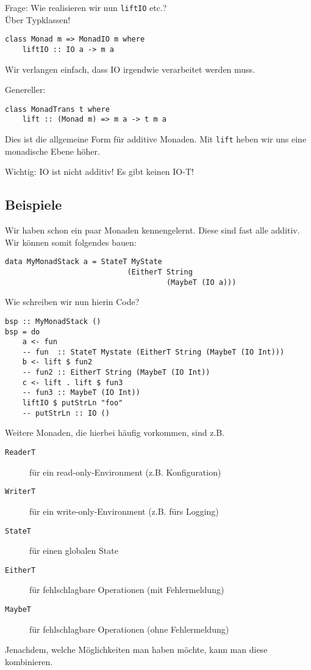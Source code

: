 \documentclass{beamer}
\begin{document}
\begin{frame}[fragile]
Frage: Wie realisieren wir nun \texttt{liftIO} etc.?\\
\pause
Über Typklassen!
\begin{verbatim}
class Monad m => MonadIO m where
    liftIO :: IO a -> m a
\end{verbatim}
Wir verlangen einfach, dass IO irgendwie verarbeitet werden muss.\par
\pause
Genereller:
\begin{verbatim}
class MonadTrans t where
    lift :: (Monad m) => m a -> t m a
\end{verbatim}
\pause
Dies ist die allgemeine Form für additive Monaden. Mit \texttt{lift} heben wir uns eine monadische Ebene höher.\\
\pause
\begin{important}
Wichtig: IO ist nicht additiv! Es gibt keinen IO-T!
\end{important}
\end{frame}

\subsection{Beispiele}

\begin{frame}[fragile]
Wir haben schon ein paar Monaden kennengelernt. Diese sind fast alle additiv. Wir können somit folgendes bauen:
\pause
\begin{verbatim}
data MyMonadStack a = StateT MyState 
                            (EitherT String 
                                     (MaybeT (IO a)))
\end{verbatim}
\pause
Wie schreiben wir nun hierin Code?
\begin{verbatim}
bsp :: MyMonadStack ()
bsp = do
    a <- fun                
    -- fun  :: StateT Mystate (EitherT String (MaybeT (IO Int)))
    b <- lift $ fun2        
    -- fun2 :: EitherT String (MaybeT (IO Int))
    c <- lift . lift $ fun3 
    -- fun3 :: MaybeT (IO Int))
    liftIO $ putStrLn "foo"
    -- putStrLn :: IO ()
\end{verbatim}
\end{frame}

\begin{frame}[fragile]
Weitere Monaden, die hierbei häufig vorkommen, sind z.B.
\begin{description}
 \item[\texttt{ReaderT}] für ein read-only-Environment (z.B. Konfiguration)
 \pause
 \item[\texttt{WriterT}] für ein write-only-Environment (z.B. fürs Logging)
 \pause
 \item[\texttt{StateT}] für einen globalen State
 \pause
 \item[\texttt{EitherT}] für fehlschlagbare Operationen (mit Fehlermeldung)
 \pause
 \item[\texttt{MaybeT}] für fehlschlagbare Operationen (ohne Fehlermeldung)
\end{description}
\pause
Jenachdem, welche Möglichkeiten man haben möchte, kann man diese kombinieren.
\end{frame}
\end{document}

